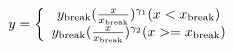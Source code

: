 \documentclass{article}
\begin{document}
\begin{equation}
  y=\left\{\begin{array}{c}
      y_{\rm break}(\frac{x}{x_{\rm break}})^{\gamma_1} (x<x_{\rm break})\\
      y_{\rm break}(\frac{x}{x_{\rm break}})^{\gamma_2} (x>=x_{\rm break})
      \end{array}
      \right .\notag
\end{equation}
\end{document}
